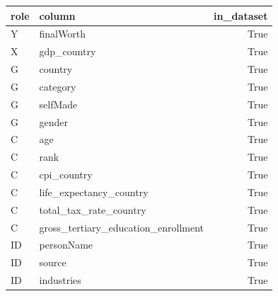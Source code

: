 \begin{tabular}{llr}
\toprule
role & column & in\_dataset \\
\midrule
Y & finalWorth & True \\
X & gdp\_country & True \\
G & country & True \\
G & category & True \\
G & selfMade & True \\
G & gender & True \\
C & age & True \\
C & rank & True \\
C & cpi\_country & True \\
C & life\_expectancy\_country & True \\
C & total\_tax\_rate\_country & True \\
C & gross\_tertiary\_education\_enrollment & True \\
ID & personName & True \\
ID & source & True \\
ID & industries & True \\
\bottomrule
\end{tabular}
